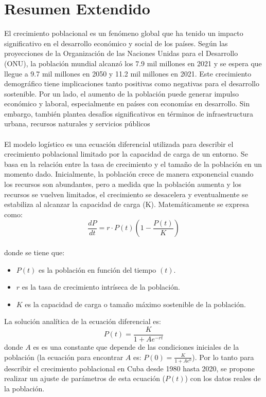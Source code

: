 \documentclass[a4paper,10pt,twocolumn]{article}
\begin{document}
\section{Resumen Extendido}\label{sec:intro}
	El crecimiento poblacional es un fenómeno global que ha tenido un impacto significativo en el desarrollo económico y social de los países. Según las proyecciones de la Organización de las Naciones Unidas para el Desarrollo (ONU), la población mundial alcanzó los 7.9 mil millones en 2021 y se espera que llegue a 9.7 mil millones en 2050 y 11.2 mil millones en 2021. Este crecimiento demográfico tiene implicaciones tanto positivas como negativas para el desarrollo sostenible. Por un lado, el aumento de la población puede generar impulso económico y laboral, especialmente en países con economías en desarrollo. Sin embargo, también plantea desafíos significativos en términos de infraestructura urbana, recursos naturales y servicios públicos\\\\
	El modelo logístico es una ecuación diferencial utilizada para describir el crecimiento poblacional limitado por la capacidad de carga de un entorno. Se basa en la relación entre la tasa de crecimiento y el tamaño de la población en un momento dado. Inicialmente, la población crece de manera exponencial cuando los recursos son abundantes, pero a medida que la población aumenta y los recursos se vuelven limitados, el crecimiento se desacelera y eventualmente se estabiliza al alcanzar la capacidad de carga (K). Matemáticamente se expresa como: $$\frac{dP}{dt} = r \cdot P(t)(1 - \frac{P(t)}{K})$$ \\ donde se tiene que:
	\begin{itemize}
		\item $P(t)$ es la población en función del tiempo $(t)$.
		\item $r$ es la tasa de crecimiento intríseca de la población.
		\item $K$ es la capacidad de carga o tamaño máximo sostenible de la población.
	\end{itemize}
	La solución analítica de la ecuación diferencial es: $$P(t) = \frac{K}{1 + Ae^{-rt}}$$
	donde $A$ es es una constante que depende de las condiciones iniciales de la población (la ecuación para encontrar $A$ es: $P(0) = \frac{K}{1 + Ae^{0}}$). Por lo tanto para describir el crecimiento poblacional en Cuba desde 1980 hasta 2020, se propone realizar un ajuste de parámetros de esta ecuación ($P(t)$) con los datos reales de la población.\\
\end{document}
